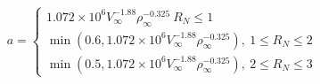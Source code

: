 \documentclass[10pt]{article}
\begin{document}
\begin{align*}a = 
\begin{cases}
1.072 \times 10^{6} V_{\infty}^{-1.88} \rho_{\infty}^{-0.325} \ R_{N} \le 1
\\
 \min \left( 0.6,  1.072 \times 10^{6} V_{\infty}^{-1.88} \rho_{\infty}^{-0.325} \right),  \ 1 \le R_{N} \le 2
\\
\min \left( 0.5,  1.072 \times 10^{6} V_{\infty}^{-1.88} \rho_{\infty}^{-0.325} \right),  \ 2 \le R_{N} \le 3
\end{cases}
\\\end{align*}
\end{document}
